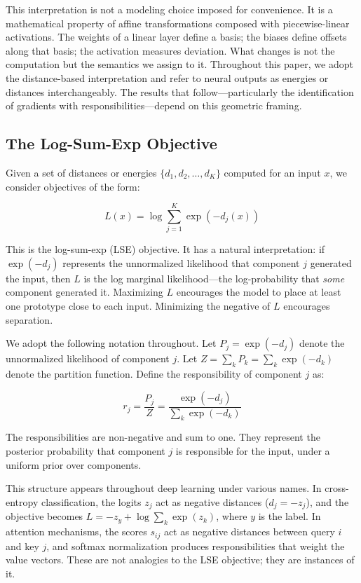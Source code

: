 This interpretation is not a modeling choice imposed for convenience. It is a mathematical property of affine transformations composed with piecewise-linear activations. The weights of a linear layer define a basis; the biases define offsets along that basis; the activation measures deviation. What changes is not the computation but the semantics we assign to it. Throughout this paper, we adopt the distance-based interpretation and refer to neural outputs as energies or distances interchangeably. The results that follow---particularly the identification of gradients with responsibilities---depend on this geometric framing.

\subsection{The Log-Sum-Exp Objective}

Given a set of distances or energies $\{d_1, d_2, \ldots, d_K\}$ computed for an input $x$, we consider objectives of the form:

\begin{equation}
L(x) = \log \sum_{j=1}^{K} \exp(-d_j(x))
\end{equation}

This is the log-sum-exp (LSE) objective. It has a natural interpretation: if $\exp(-d_j)$ represents the unnormalized likelihood that component $j$ generated the input, then $L$ is the log marginal likelihood---the log-probability that \emph{some} component generated it. Maximizing $L$ encourages the model to place at least one prototype close to each input. Minimizing the negative of $L$ encourages separation.

We adopt the following notation throughout. Let $P_j = \exp(-d_j)$ denote the unnormalized likelihood of component $j$. Let $Z = \sum_k P_k = \sum_k \exp(-d_k)$ denote the partition function. Define the responsibility of component $j$ as:

\begin{equation}
r_j = \frac{P_j}{Z} = \frac{\exp(-d_j)}{\sum_k \exp(-d_k)}
\end{equation}

The responsibilities are non-negative and sum to one. They represent the posterior probability that component $j$ is responsible for the input, under a uniform prior over components.

This structure appears throughout deep learning under various names. In cross-entropy classification, the logits $z_j$ act as negative distances ($d_j = -z_j$), and the objective becomes $L = -z_y + \log \sum_k \exp(z_k)$, where $y$ is the label. In attention mechanisms, the scores $s_{ij}$ act as negative distances between query $i$ and key $j$, and softmax normalization produces responsibilities that weight the value vectors. These are not analogies to the LSE objective; they are instances of it.

